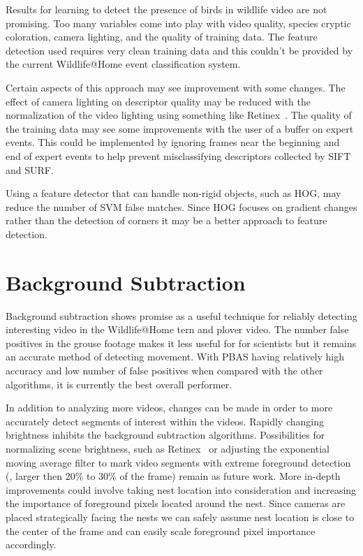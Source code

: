 Results for learning to detect the presence of birds in wildlife video are not promising. Too many variables come into play with video quality, species cryptic coloration, camera lighting, and the quality of training data. The feature detection used requires very clean training data and this couldn't be provided by the current Wildlife@Home event classification system.

Certain aspects of this approach may see improvement with some changes. The effect of camera lighting on descriptor quality may be reduced with the normalization of the video lighting using something like Retinex~\cite{land_1971_lightness, jobson_1997_multiscale}. The quality of the training data may see some improvements with the user of a buffer on expert events. This could be implemented by ignoring frames near the beginning and end of expert events to help prevent misclassifying descriptors collected by SIFT and SURF\@.

Using a feature detector that can handle non-rigid objects, such as HOG\cite{dalal_2005_histograms}, may reduce the number of SVM false matches. Since HOG focuses on gradient changes rather than the detection of corners it may be a better approach to feature detection.


\section{Background Subtraction}
\label{sec:conclusion_background_subtraction}

Background subtraction shows promise as a useful technique for reliably detecting interesting video in the Wildlife@Home tern and plover video. The number false positives in the grouse footage makes it less useful for for scientists but it remains an accurate method of detecting movement. With PBAS having relatively high accuracy and low number of false positives when compared with the other algorithms, it is currently the best overall performer.

In addition to analyzing more videos, changes can be made in order to more accurately detect segments of interest within the videos. Rapidly changing brightness inhibits the background subtraction algorithms. Possibilities for normalizing scene brightness, such as Retinex~\cite{land_1971_lightness, jobson_1997_multiscale} or adjusting the exponential moving average filter to mark video segments with extreme foreground detection (\eg, larger then 20\% to 30\% of the frame) remain as future work. More in-depth improvements could involve taking nest location into consideration and increasing the importance of foreground pixels located around the nest. Since cameras are placed strategically facing the nests we can safely assume nest location is close to the center of the frame and can easily scale foreground pixel importance accordingly.


